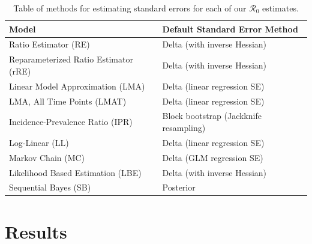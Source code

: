 \documentclass[12pt]{article}
\newcommand{\rr}{\ensuremath{\mathcal{R}_0}}
\begin{document}
\begin{table}[H]
	\centering
	\begin{tabular}{@{}ll@{}}
		\toprule
		\textbf{Model} & \textbf{Default Standard Error Method} \\ \midrule
		Ratio Estimator (RE) & Delta (with inverse Hessian)\\
		Reparameterized Ratio Estimator (rRE) & Delta (with inverse Hessian) \\
		Linear Model Approximation (LMA) & Delta (linear regression SE) \\
		LMA, All Time Points  (LMAT)& Delta (linear regression SE)\\
		Incidence-Prevalence Ratio (IPR) & Block bootstrap (Jackknife resampling) \\
		Log-Linear (LL) & Delta (linear regression SE) \\
          Markov Chain (MC) & Delta (GLM regression SE) \\
          Likelihood Based Estimation (LBE) & Delta (with inverse Hessian)\\
		Sequential Bayes (SB) & Posterior\\
		\bottomrule
	\end{tabular}
	\caption{Table of methods for estimating standard errors for each of our $\rr$ estimates.}
	\label{tab:se-methods}
\end{table}



\section{Results}\label{sec:results-top}
\end{document}
